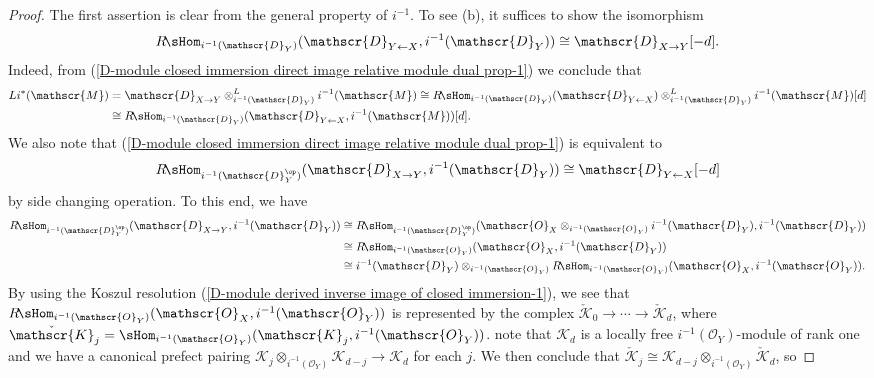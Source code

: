\begin{proof}
The first assertion is clear from the general property of $i^{-1}$. To see (b), it suffices to show the isomorphism
\begin{equation}\label{D-module closed immersion direct image relative module dual prop-1}
R\!\sHom_{i^{-1}(\mathscr{D}_Y)}(\mathscr{D}_{Y\leftarrow X},i^{-1}(\mathscr{D}_Y))\cong\mathscr{D}_{X\to Y}[-d].
\end{equation}
Indeed, from (\ref{D-module closed immersion direct image relative module dual prop-1}) we conclude that
\begin{align*}
Li^*(\mathscr{M})&=\mathscr{D}_{X\to Y}\otimes_{i^{-1}(\mathscr{D}_Y)}^Li^{-1}(\mathscr{M})\cong R\!\sHom_{i^{-1}(\mathscr{D}_Y)}(\mathscr{D}_{Y\leftarrow X})\otimes_{i^{-1}(\mathscr{D}_Y)}^Li^{-1}(\mathscr{M})[d]\\
&\cong R\!\sHom_{i^{-1}(\mathscr{D}_Y)}(\mathscr{D}_{Y\leftarrow X},i^{-1}(\mathscr{M}))[d].
\end{align*}
We also note that (\ref{D-module closed immersion direct image relative module dual prop-1}) is equivalent to
\begin{equation}\label{D-module closed immersion direct image relative module dual prop-2}
R\!\sHom_{i^{-1}(\mathscr{D}_Y^{\op})}(\mathscr{D}_{X\to Y},i^{-1}(\mathscr{D}_Y))\cong\mathscr{D}_{Y\leftarrow X}[-d]
\end{equation}
by side changing operation. To this end, we have
\begin{align*}
R\!\sHom_{i^{-1}(\mathscr{D}_Y^{\op})}(\mathscr{D}_{X\to Y},i^{-1}(\mathscr{D}_Y))&\cong R\!\sHom_{i^{-1}(\mathscr{D}_Y^{\op})}(\mathscr{O}_X\otimes_{i^{-1}(\mathscr{O}_Y)}i^{-1}(\mathscr{D}_Y),i^{-1}(\mathscr{D}_Y))\\
&\cong R\!\sHom_{i^{-1}(\mathscr{O}_Y)}(\mathscr{O}_X,i^{-1}(\mathscr{D}_Y))\\
&\cong i^{-1}(\mathscr{D}_Y)\otimes_{i^{-1}(\mathscr{O}_Y)}R\!\sHom_{i^{-1}(\mathscr{O}_Y)}(\mathscr{O}_X,i^{-1}(\mathscr{O}_Y)).
\end{align*}
By using the Koszul resolution (\ref{D-module derived inverse image of closed immersion-1}), we see that $R\!\sHom_{i^{-1}(\mathscr{O}_Y)}(\mathscr{O}_X,i^{-1}(\mathscr{O}_Y))$ is represented by the complex $\check{\mathscr{K}}_0\to\cdots\to\check{\mathscr{K}}_d$, where $\check{\mathscr{K}}_j=\sHom_{i^{-1}(\mathscr{O}_Y)}(\mathscr{K}_j,i^{-1}(\mathscr{O}_Y))$. note that $\mathscr{K}_d$ is a locally free $i^{-1}(\mathscr{O}_Y)$-module of rank one and we have a canonical prefect pairing $\mathscr{K}_j\otimes_{i^{-1}(\mathscr{O}_Y)}\mathscr{K}_{d-j}\to\mathscr{K}_d$ for each $j$. We then conclude that $\check{\mathscr{K}}_j\cong\mathscr{K}_{d-j}\otimes_{i^{-1}(\mathscr{O}_Y)}\check{\mathscr{K}}_d$, so

\end{proof}
